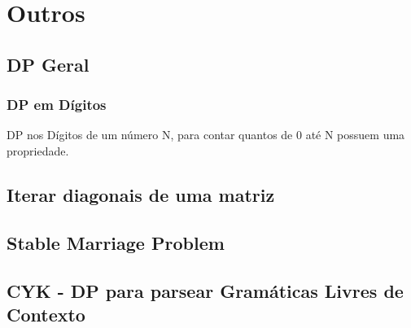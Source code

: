 \section{Outros}

\subsection{DP Geral}
\subsubsection{DP em D\'{i}gitos}
DP nos D\'{i}gitos de um n\'{u}mero N, para contar quantos de 0 at\'{e} N possuem uma propriedade.

\divisor

\subsection{Iterar diagonais de uma matriz}

\divisor

\subsection{Stable Marriage Problem}

\divisor

\subsection{CYK - DP para parsear Gram\'{a}ticas Livres de Contexto}

